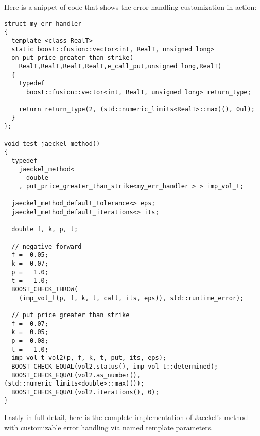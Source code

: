 \documentclass[a4paper,twoside,twocolumn]{article}
\begin{document}
Here is a snippet of code that shows the error handling customization
in action:
\begin{verbatim}
struct my_err_handler
{
  template <class RealT>
  static boost::fusion::vector<int, RealT, unsigned long>
  on_put_price_greater_than_strike(
    RealT,RealT,RealT,RealT,e_call_put,unsigned long,RealT)
  {
    typedef
      boost::fusion::vector<int, RealT, unsigned long> return_type;

    return return_type(2, (std::numeric_limits<RealT>::max)(), 0ul);
  }
};

void test_jaeckel_method()
{
  typedef
    jaeckel_method<
      double
    , put_price_greater_than_strike<my_err_handler > > imp_vol_t;

  jaeckel_method_default_tolerance<> eps;
  jaeckel_method_default_iterations<> its;

  double f, k, p, t;

  // negative forward
  f = -0.05; 
  k =  0.07;
  p =   1.0;
  t =   1.0;
  BOOST_CHECK_THROW(
    (imp_vol_t(p, f, k, t, call, its, eps)), std::runtime_error);

  // put price greater than strike
  f =  0.07;
  k =  0.05;
  p =  0.08;
  t =   1.0; 
  imp_vol_t vol2(p, f, k, t, put, its, eps);
  BOOST_CHECK_EQUAL(vol2.status(), imp_vol_t::determined);
  BOOST_CHECK_EQUAL(vol2.as_number(), (std::numeric_limits<double>::max)());
  BOOST_CHECK_EQUAL(vol2.iterations(), 0);
}
\end{verbatim}
Lastly in full detail, here is the complete implementation of
Jaeckel's method with customizable error handling via named template
parameters.
\end{document}
